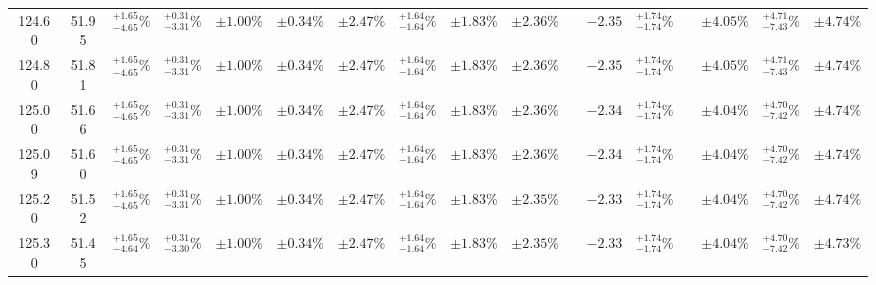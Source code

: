 \begin{landscape}
\begin{table}[ht!]
{\begin{tabular}{| cc | cccc | ccc | c |@{}c@{\;}| cc |@{}c@{\;}| ccc |}
124.60 & 51.95 & \({}^{ +1.65}_{ -4.65}\%\) & {\color{black!55}\({}^{ +0.31}_{ -3.31}\%\)} & {\color{black!55}\(\pm{  1.00}\%\)} & {\color{black!55}\(\pm{  0.34}\%\)} & \(\pm 2.47\%\) & {\color{black!55}\({}^{ +1.64}_{ -1.64}\%\)} & {\color{black!55}\(\pm 1.83\%\)} & \(\pm{  2.36}\%\) &  & \(-2.35\) & \({}^{ +1.74}_{ -1.74}\%\) &  & \(\pm 4.05\%\) & \({}^{ +4.71}_{ -7.43}\%\) & \(\pm 4.74\%\)\\
124.80 & 51.81 & \({}^{ +1.65}_{ -4.65}\%\) & {\color{black!55}\({}^{ +0.31}_{ -3.31}\%\)} & {\color{black!55}\(\pm{  1.00}\%\)} & {\color{black!55}\(\pm{  0.34}\%\)} & \(\pm 2.47\%\) & {\color{black!55}\({}^{ +1.64}_{ -1.64}\%\)} & {\color{black!55}\(\pm 1.83\%\)} & \(\pm{  2.36}\%\) &  & \(-2.35\) & \({}^{ +1.74}_{ -1.74}\%\) &  & \(\pm 4.05\%\) & \({}^{ +4.71}_{ -7.43}\%\) & \(\pm 4.74\%\)\\
125.00 & 51.66 & \({}^{ +1.65}_{ -4.65}\%\) & {\color{black!55}\({}^{ +0.31}_{ -3.31}\%\)} & {\color{black!55}\(\pm{  1.00}\%\)} & {\color{black!55}\(\pm{  0.34}\%\)} & \(\pm 2.47\%\) & {\color{black!55}\({}^{ +1.64}_{ -1.64}\%\)} & {\color{black!55}\(\pm 1.83\%\)} & \(\pm{  2.36}\%\) &  & \(-2.34\) & \({}^{ +1.74}_{ -1.74}\%\) &  & \(\pm 4.04\%\) & \({}^{ +4.70}_{ -7.42}\%\) & \(\pm 4.74\%\)\\
125.09 & 51.60 & \({}^{ +1.65}_{ -4.65}\%\) & {\color{black!55}\({}^{ +0.31}_{ -3.31}\%\)} & {\color{black!55}\(\pm{  1.00}\%\)} & {\color{black!55}\(\pm{  0.34}\%\)} & \(\pm 2.47\%\) & {\color{black!55}\({}^{ +1.64}_{ -1.64}\%\)} & {\color{black!55}\(\pm 1.83\%\)} & \(\pm{  2.36}\%\) &  & \(-2.34\) & \({}^{ +1.74}_{ -1.74}\%\) &  & \(\pm 4.04\%\) & \({}^{ +4.70}_{ -7.42}\%\) & \(\pm 4.74\%\)\\
125.20 & 51.52 & \({}^{ +1.65}_{ -4.65}\%\) & {\color{black!55}\({}^{ +0.31}_{ -3.31}\%\)} & {\color{black!55}\(\pm{  1.00}\%\)} & {\color{black!55}\(\pm{  0.34}\%\)} & \(\pm 2.47\%\) & {\color{black!55}\({}^{ +1.64}_{ -1.64}\%\)} & {\color{black!55}\(\pm 1.83\%\)} & \(\pm{  2.35}\%\) &  & \(-2.33\) & \({}^{ +1.74}_{ -1.74}\%\) &  & \(\pm 4.04\%\) & \({}^{ +4.70}_{ -7.42}\%\) & \(\pm 4.74\%\)\\
125.30 & 51.45 & \({}^{ +1.65}_{ -4.64}\%\) & {\color{black!55}\({}^{ +0.31}_{ -3.30}\%\)} & {\color{black!55}\(\pm{  1.00}\%\)} & {\color{black!55}\(\pm{  0.34}\%\)} & \(\pm 2.47\%\) & {\color{black!55}\({}^{ +1.64}_{ -1.64}\%\)} & {\color{black!55}\(\pm 1.83\%\)} & \(\pm{  2.35}\%\) &  & \(-2.33\) & \({}^{ +1.74}_{ -1.74}\%\) &  & \(\pm 4.04\%\) & \({}^{ +4.70}_{ -7.42}\%\) & \(\pm 4.73\%\)\\

\end{tabular}}
\end{table}
\end{landscape}
